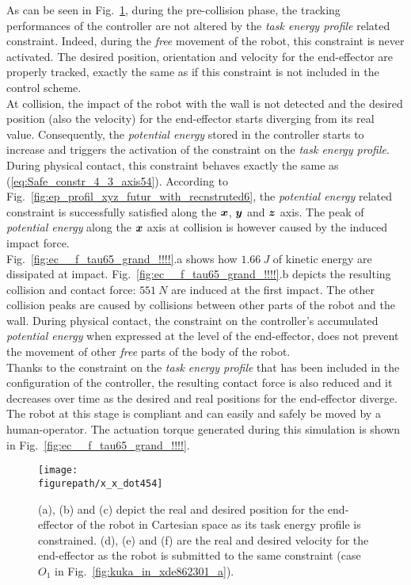 As can be seen in Fig.~\ref{fig:x_x_dot454}, during the pre-collision phase, the tracking performances of the controller are not altered by the \textit{task energy profile} related constraint. Indeed, during the \textit{free} movement of the robot, this constraint is never activated. The desired position, orientation and velocity for the end-effector are properly tracked, exactly the same as if this constraint is not included in the control scheme. \\
At collision, the impact of the robot with the wall is not detected and the desired position (also the velocity) for the end-effector starts diverging from its real value. Consequently, the \textit{potential energy} stored in the controller starts to increase and triggers the activation of the constraint on the \textit{task energy profile}. During physical contact, this constraint behaves exactly the same as (\ref{eq:Safe_constr_4_3_axis54}). According to Fig.~\ref{fig:ep_profil_xyz_futur_with_recnstruted6}, the \textit{potential energy} related constraint is successfully satisfied along the $\mbox{\boldmath${x}$}$, $\mbox{\boldmath${y}$}$ and $\mbox{\boldmath${z}$}$ axis.
The peak of \textit{potential energy} along the $\mbox{\boldmath${x}$}$ axis at collision is however caused by the induced impact force. \\
Fig.~\ref{fig:ec__f_tau65_grand_!!!!}.a shows how $1.66~J$ of kinetic energy are dissipated at impact. Fig.~\ref{fig:ec__f_tau65_grand_!!!!}.b depicts the resulting collision  and contact force: $551~N$ are induced at the first impact. The other collision peaks are caused by collisions between other parts of the robot and the wall. During physical contact, the constraint on the controller's accumulated \textit{potential energy} when expressed at the level of the end-effector, does not prevent the movement of other \textit{free} parts of the body of the robot.  \\ 
Thanks to the constraint on the \textit{task energy profile} that has been included in the configuration of the controller, the resulting contact force is also reduced and it decreases over time as the desired and real positions for the end-effector diverge. The robot at this stage is compliant and can easily and safely be moved by a human-operator. The actuation torque generated during this simulation is shown in Fig.~\ref{fig:ec__f_tau65_grand_!!!!}.
\begin{figure}[!htbp]
\centering
{\texttt{[image: \\figurepath/x\_x\_dot454]}}
\caption{(a), (b) and (c) depict the real and desired position for the end-effector of the robot in Cartesian space as its task energy profile is constrained. (d), (e) and (f) are the real and desired velocity for the end-effector as the robot is submitted to the same constraint (case $O_1$ in Fig.~\ref{fig:kuka_in_xde862301_a}).} 
\label{fig:x_x_dot454}
\end{figure}
